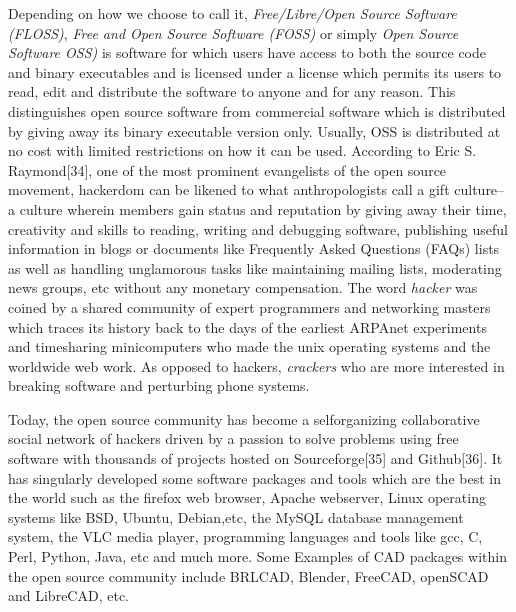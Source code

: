 \hspace{30} Depending   on   how   we   choose   to   call   it,   \textit{Free/Libre/Open   Source  
Software   (FLOSS)},   \textit{Free   and   Open   Source   Software   (FOSS)}   or   simply   \textit{Open  
Source   Software   OSS)}   is   software   for   which   users   have   access   to   both   the  
source   code   and   binary   executables   and   is   licensed   under   a   license   which  
permits   its   users   to   read,   edit   and   distribute   the   software   to   anyone   and   for   any  
reason.   This   distinguishes   open   source   software   from   commercial   software  
which   is   distributed   by   giving   away   its   binary   executable   version   only.   Usually,  
OSS   is   distributed   at   no   cost   with   limited   restrictions   on   how   it   can   be   used.  
According   to   Eric   S.   Raymond[34],   one   of   the   most   prominent   evangelists   of  
the   open   source   movement,   hackerdom   can   be   likened   to   what   anthropologists  
call   a   gift   culture–   a   culture   wherein   members   gain   status   and   reputation   by  
giving   away   their   time,   creativity   and   skills   to   reading,   writing   and   debugging  
software,   publishing   useful   information   in   blogs   or   documents   like   Frequently  
Asked   Questions   (FAQs)   lists   as   well   as   handling   unglamorous   tasks   like  
maintaining   mailing   lists,   moderating   news   groups,   etc   without   any   monetary  
compensation.   The   word   \textit{hacker}   was   coined   by   a   shared   community   of   expert  
programmers   and   networking   masters   which   traces   its   history   back   to   the   days  
of   the   earliest   ARPAnet   experiments   and   time­sharing   minicomputers   who  
made   the   unix   operating   systems   and   the   world­wide   web   work.   As   opposed   to  
hackers,   \textit{crackers}   who   are   more   interested   in   breaking   software   and   perturbing  
phone systems.   

\hspace{30} Today,   the   open   source   community   has   become   a   self­organizing  
collaborative   social   network   of   hackers   driven   by   a   passion   to   solve   problems  
using   free   software   with   thousands   of   projects   hosted   on   Sourceforge[35]   and  
Github[36].   It   has   singularly   developed   some   software   packages   and   tools  
which   are   the   best   in   the   world   such   as   the   firefox   web   browser,   Apache  
web­server,   Linux   operating   systems   like   BSD,   Ubuntu,   Debian,etc,   the   MySQL  
database   management   system,   the   VLC   media   player,   programming  languages   and   tools   like   gcc,   C,   Perl,   Python,   Java,   etc   and   much   more.   Some  Examples   of   CAD   packages   within   the   open   source  community   include   BRL­CAD,   Blender,   FreeCAD,   openSCAD   and   LibreCAD,  
etc.

